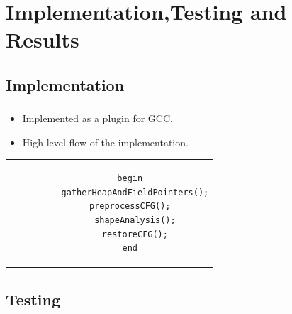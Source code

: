 \documentclass[mathserif,10pt]{beamer}
\newcommand{\cmt}[1]{}
\begin{document}
\section{Implementation,Testing and Results}
\subsection{Implementation}

\lstset{basicstyle=\normalsize}

\begin{frame}[fragile]

\frametitle{\subsecname}

\begin{itemize}
 \item Implemented as a plugin for GCC.
 \item High level flow of the implementation. 
\end{itemize}

\begin{center}
\begin{tabular}{c} 
\begin{lstlisting}
		begin
		  gatherHeapAndFieldPointers();
		  preprocessCFG();  
		  shapeAnalysis();
		  restoreCFG();
		end
\end{lstlisting} 
\end{tabular}
\cmt{optimizations done}
\end{center}
\end{frame}

\lstset{basicstyle=\scriptsize}

\subsection{Testing}
\end{document}
